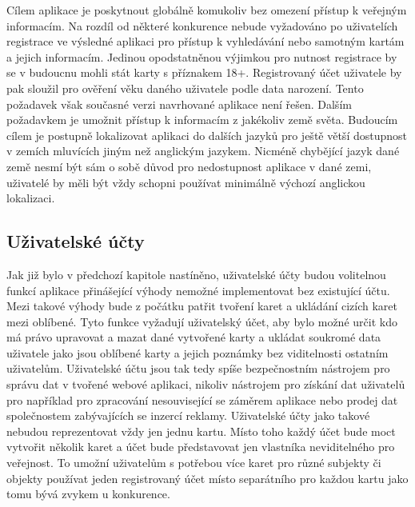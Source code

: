 	Cílem aplikace je poskytnout globálně komukoliv bez omezení přístup k veřejným informacím.
	Na rozdíl od některé konkurence nebude vyžadováno po uživatelích registrace ve výsledné aplikaci pro přístup k vyhledávání
	nebo samotným kartám a jejich informacím.
	Jedinou opodstatněnou výjimkou pro nutnost registrace by se v budoucnu mohli stát karty s příznakem 18+.
	Registrovaný účet uživatele by pak sloužil pro ověření věku daného uživatele podle data narození.
	Tento požadavek však současné verzi navrhované aplikace není řešen.
	Dalším požadavkem je umožnit přístup k informacím z jakékoliv země světa.
	Budoucím cílem je postupně lokalizovat aplikaci do dalších jazyků pro ještě větší dostupnost v zemích mluvících
	jiným než anglickým jazykem.
	Nicméně chybějící jazyk dané země nesmí být sám o sobě důvod pro nedostupnost aplikace v dané zemi, uživatelé by
	měli být vždy schopni používat minimálně výchozí anglickou lokalizaci.

	\subsection{Uživatelské účty}

	Jak již bylo v předchozí kapitole nastíněno, uživatelské účty budou volitelnou funkcí aplikace přinášející výhody
	nemožné implementovat bez existující účtu.
	Mezi takové výhody bude z počátku patřit tvoření karet a ukládání cizích karet mezi oblíbené.
	Tyto funkce vyžadují uživatelský účet, aby bylo možné určit kdo má právo upravovat a mazat dané vytvořené karty
	a ukládat soukromé data uživatele jako jsou oblíbené karty a jejich poznámky bez viditelnosti ostatním uživatelům.
	Uživatelské účtu jsou tak tedy spíše bezpečnostním nástrojem pro správu dat v tvořené webové aplikaci, nikoliv
	nástrojem pro získání dat uživatelů pro například pro zpracování nesouvisející se záměrem aplikace nebo prodej dat
	společnostem zabývajících se inzercí reklamy.
	Uživatelské účty jako takové nebudou reprezentovat vždy jen jednu kartu.
	Místo toho každý účet bude moct vytvořit několik karet a účet bude představovat jen vlastníka neviditelného pro
	veřejnost.
	To umožní uživatelům s potřebou více karet pro různé subjekty či objekty používat jeden registrovaný účet místo
	separátního pro každou kartu jako tomu bývá zvykem u konkurence.

